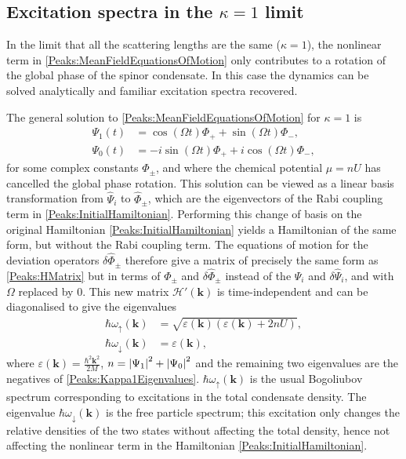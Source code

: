 \subsection{Excitation spectra in the $\kappa = 1$ limit}
\label{Peaks:Kappa1Limit}
In the limit that all the scattering lengths are the same ($\kappa = 1$), the nonlinear term in \eqref{Peaks:MeanFieldEquationsOfMotion} only contributes to a rotation of the global phase of the spinor condensate. In this case the dynamics can be solved analytically and familiar excitation spectra recovered.

The general solution to \eqref{Peaks:MeanFieldEquationsOfMotion} for $\kappa = 1$ is
\begin{subequations}
    \label{Peaks:Kappa1MeanFieldSolution}
    \begin{align}
        \Psi_1(t) &= \cos(\Omega t) \Phi_+ + \sin(\Omega t) \Phi_-, \\
        \Psi_0(t) &= -i\sin(\Omega t) \Phi_+ + i\cos(\Omega t) \Phi_-,
    \end{align}
\end{subequations}
for some complex constants $\Phi_\pm$, and where the chemical potential $\mu = n U$ has cancelled the global phase rotation. This solution can be viewed as a linear basis transformation from $\hat{\Psi}_i$ to $\hat{\Phi}_\pm$, which are the eigenvectors of the Rabi coupling term in \eqref{Peaks:InitialHamiltonian}. Performing this change of basis on the original Hamiltonian \eqref{Peaks:InitialHamiltonian} yields a Hamiltonian of the same form, but without the Rabi coupling term. The equations of motion for the deviation operators $\delta\hat{\Phi}_\pm$ therefore give a matrix of precisely the same form as \eqref{Peaks:HMatrix} but in terms of $\Phi_\pm$ and $\delta\hat{\Phi}_\pm$ instead of the $\Psi_i$ and $\delta\hat{\Psi}_i$, and with $\Omega$ replaced by 0. This new matrix $\mathcal{H}'(\bm{k})$ is time-independent and can be diagonalised to give the eigenvalues
\begin{subequations}
    \label{Peaks:Kappa1Eigenvalues}
    \begin{align}
        \hbar \omega_\uparrow(\bm{k}) &= \sqrt{\varepsilon(\bm{k})\left(\varepsilon(\bm{k}) + 2 n U\right)},\\
        \hbar \omega_\downarrow(\bm{k}) &= \varepsilon(\bm{k}),
    \end{align}
\end{subequations}
where $\displaystyle\varepsilon(\bm{k}) = \frac{\hbar^2\bm{k}^2}{2M}$, $n= \left|\Psi_1\right|^2 + \left|\Psi_0\right|^2$ and the remaining two eigenvalues are the negatives of \eqref{Peaks:Kappa1Eigenvalues}. $\hbar \omega_\uparrow(\bm{k})$ is the usual Bogoliubov spectrum \citep{Bogoliubov:1947} corresponding to excitations in the total condensate density. The eigenvalue $\hbar \omega_\downarrow(\bm{k})$ is the free particle spectrum; this excitation only changes the relative densities of the two states without affecting the total density, hence not affecting the nonlinear term in the Hamiltonian \eqref{Peaks:InitialHamiltonian}.

